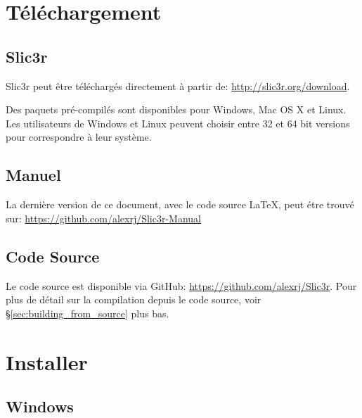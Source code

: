 

\section{T\'el\'echargement}

\subsection{Slic3r} %
\label{sub:slic3r}
Slic3r peut \^etre t\'el\'echarg\'es directement \`a partir de: \url{http://slic3r.org/download}.

Des paquets pr\'e-compil\'es sont disponibles pour Windows, Mac OS X et Linux. Les utilisateurs de Windows et Linux peuvent choisir entre 32 et 64 bit versions pour correspondre \`a leur syst\`eme.

\subsection{Manuel} %
\label{sub:manual}

La derni\`ere version de ce document, avec le code source {\LaTeX}, peut \'etre trouv\'e sur: \url{https://github.com/alexrj/Slic3r-Manual}


\subsection{Code Source} %
\label{sub:source}

Le code source est disponible via GitHub: \url{https://github.com/alexrj/Slic3r}. Pour plus de d\'etail sur la compilation depuis le code source, voir §\ref{sec:building_from_source} plus bas.


\section{Installer}

\subsection{Windows}

